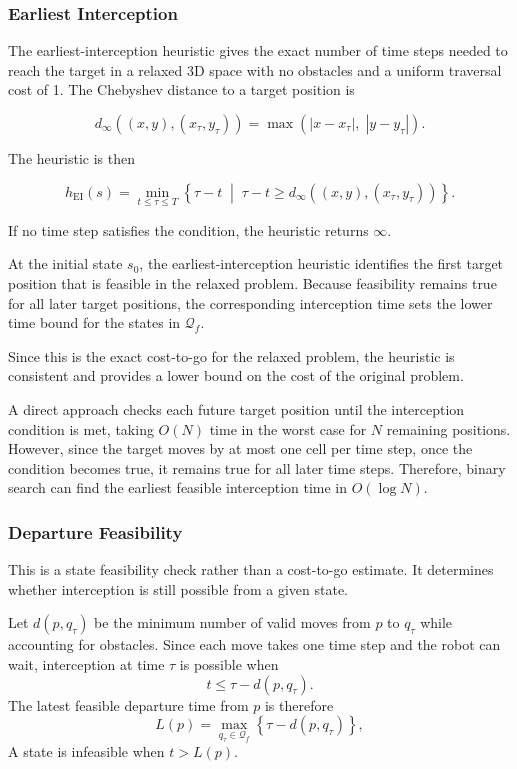\documentclass[11pt]{article}
\begin{document}
\subsubsection{Earliest Interception}
The earliest-interception heuristic gives the exact number of time steps needed to reach the target in a relaxed 3D space with no obstacles and a uniform traversal cost of 1. The Chebyshev distance to a target position is

\[
  d_\infty\!\left((x,y),(x_\tau,y_\tau)\right)
  =
  \max\left(|x-x_\tau|,\;|y-y_\tau|\right).
\]

The heuristic is then

\[
  h_{\mathrm{EI}}(s)
  =
  \min_{t \leq \tau \leq T}
  \left\{
  \tau-t
  \;\middle|\;
  \tau-t \geq
  d_\infty\!\left((x,y),(x_\tau,y_\tau)\right)
  \right\}.
\]

If no time step satisfies the condition, the heuristic returns \(\infty\).

At the initial state \(s_0\), the earliest-interception heuristic identifies the
first target position that is feasible in the relaxed problem. Because
feasibility remains true for all later target positions, the
corresponding interception time sets the lower time bound for the states in
\(\mathcal{Q}_f\).

Since this is the exact cost-to-go for the relaxed problem, the heuristic is consistent and provides a lower bound on the cost of the original problem.

A direct approach checks each future target position until the interception condition is met, taking \(O(N)\) time in the worst case for \(N\) remaining positions. However, since the target moves by at most one cell per time step, once the condition becomes true, it remains true for all later time steps. Therefore, binary search can find the earliest feasible interception time in \(O(\log N)\).

\subsubsection{Departure Feasibility}
This is a state feasibility check rather than a cost-to-go estimate. It determines whether interception is still possible from a given state.

Let \(d(p,q_\tau)\) be the minimum number of valid moves from \(p\) to \(q_\tau\) while accounting for obstacles. Since each move takes one time step and the robot can wait, interception at time \(\tau\) is possible when
\[
  t\leq \tau-d(p,q_\tau).
\]
The latest feasible departure time from \(p\) is therefore
\[
  L(p)=\max_{q_\tau\in\mathcal{Q}_f}
  \left\{\tau-d(p,q_\tau)\right\},
\]
A state is infeasible when \(t>L(p)\).
\end{document}
